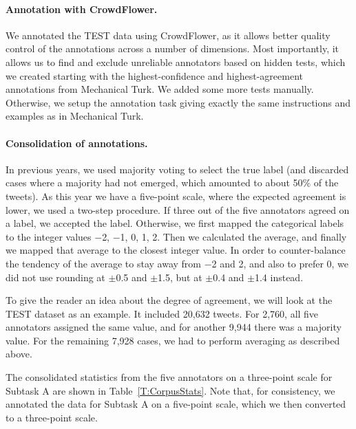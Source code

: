 \documentclass[11pt,letterpaper]{article}
\begin{document}
\paragraph{Annotation with CrowdFlower.} 
We annotated the TEST data using CrowdFlower, as it allows better
quality control of the annotations across a number of dimensions. Most
importantly, it allows us to find and exclude unreliable annotators based
on hidden tests, which we created starting with the highest-confidence
and highest-agreement annotations from Mechanical Turk. We added some more tests manually.  Otherwise, we
setup the annotation task giving exactly the same instructions and
examples as in Mechanical Turk.

\paragraph{Consolidation of annotations.} 
In previous years,
we used majority voting to select the true label (and discarded
cases where a majority had not emerged, which amounted to about 50\%
of the tweets). As this year we have a five-point scale, where the
expected agreement is lower, we used a two-step procedure. If three
out of the five annotators agreed on a label, we accepted the label.
Otherwise, we first mapped the categorical labels to the integer
values $-$2, $-$1, 0, 1, 2. Then we calculated the average, and
finally we mapped that average to the closest integer value. In order
to counter-balance the tendency of the average to stay away from
$-$2 and 2, and also to prefer 0, we did not use rounding at $\pm$0.5
and $\pm$1.5, but at $\pm$0.4 and $\pm$1.4 instead.

To give the reader an idea about the degree of agreement, we will look at the TEST dataset as an example. It included 20,632 tweets. For 2,760,
all five annotators assigned the same value, and for another 9,944
there was a majority value. For the remaining 7,928 cases, we had to
perform averaging as described above.

The consolidated statistics from the five annotators on a three-point
scale for Subtask A are shown in Table~\ref{T:CorpusStats}.  Note
that, for consistency, we annotated the data for Subtask A on a
five-point scale, which we then converted to a three-point scale.
\end{document}
